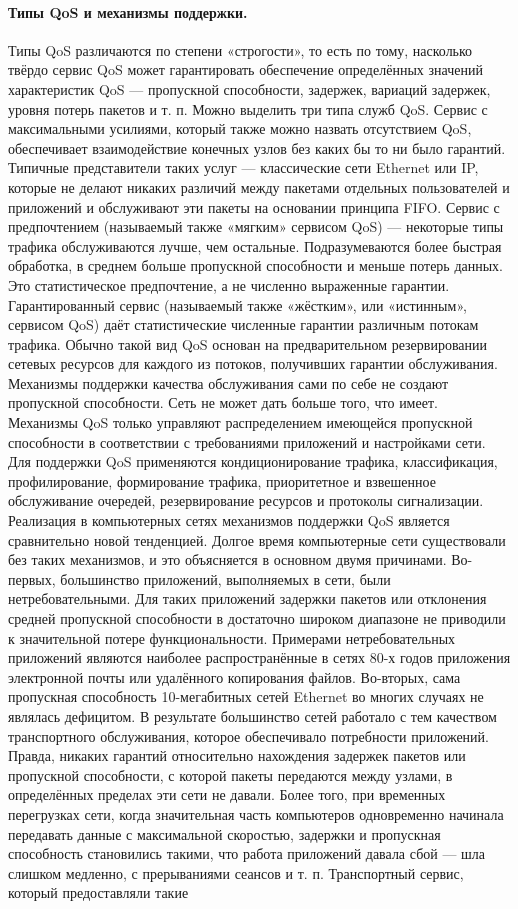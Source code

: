\documentclass[a4paper,12pt]{article}
\begin{document}
\paragraph{Типы QoS и механизмы поддержки.}
Типы QoS различаются по степени «строгости», то есть по тому, насколько твёрдо сервис QoS может гарантировать обеспечение определённых значений характеристик QoS — пропускной способности, задержек, вариаций задержек, уровня потерь пакетов и т. п. Можно выделить три типа служб QoS. Сервис с максимальными усилиями, который также можно назвать отсутствием QoS, обеспечивает взаимодействие конечных узлов без каких бы то ни было гарантий. Типичные представители таких услуг — классические сети Ethernet или IP, которые не делают никаких различий между пакетами отдельных пользователей и приложений и обслуживают эти пакеты на основании принципа FIFO. Сервис с предпочтением (называемый также «мягким» сервисом QoS) — некоторые типы трафика обслуживаются лучше, чем остальные. Подразумеваются более быстрая обработка, в среднем больше пропускной способности и меньше потерь данных. Это статистическое предпочтение, а не численно выраженные гарантии. Гарантированный сервис (называемый также «жёстким», или «истинным», сервисом QoS) даёт статистические численные гарантии различным потокам трафика. Обычно такой вид QoS основан на предварительном резервировании сетевых ресурсов для каждого из потоков, получивших гарантии обслуживания. Механизмы поддержки качества обслуживания сами по себе не создают пропускной способности. Сеть не может дать больше того, что имеет. Механизмы QoS только управляют распределением имеющейся пропускной способности в соответствии с требованиями приложений и настройками сети. Для поддержки QoS применяются кондиционирование трафика, классификация, профилирование, формирование трафика, приоритетное и взвешенное обслуживание очередей, резервирование ресурсов и протоколы сигнализации. Реализация в компьютерных сетях механизмов поддержки QoS является сравнительно новой тенденцией. Долгое время компьютерные сети существовали без таких механизмов, и это объясняется в основном двумя причинами. Во-первых, большинство приложений, выполняемых в сети, были нетребовательными. Для таких приложений задержки пакетов или отклонения средней пропускной способности в достаточно широком диапазоне не приводили к значительной потере функциональности. Примерами нетребовательных приложений являются наиболее распространённые в сетях 80-х годов приложения электронной почты или удалённого копирования файлов. Во-вторых, сама пропускная способность 10-мегабитных сетей Ethernet во многих случаях не являлась дефицитом. В результате большинство сетей работало с тем качеством транспортного обслуживания, которое обеспечивало потребности приложений. Правда, никаких гарантий относительно нахождения задержек пакетов или пропускной способности, с которой пакеты передаются между узлами, в определённых пределах эти сети не давали. Более того, при временных перегрузках сети, когда значительная часть компьютеров одновременно начинала передавать данные с максимальной скоростью, задержки и пропускная способность становились такими, что работа приложений давала сбой — шла слишком медленно, с прерываниями сеансов и т. п. Транспортный сервис, который предоставляли такие 
\end{document}
